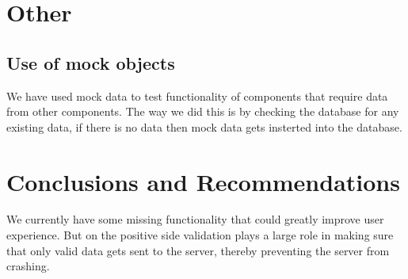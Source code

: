 \documentclass[11pt,fleqn]{book} %
\begin{document}

\chapter{Other}
	\section{Use of mock objects}
	We have used mock data to test functionality of components that require data from other components. The way we did this is by checking the database for any existing data, if there is no data then mock data gets insterted into the database.


\chapter{Conclusions and Recommendations}
We currently have some missing functionality that could greatly improve user experience. But on the positive side validation plays a large role in making sure that only valid data gets sent to the server, thereby preventing the server from crashing.
\end{document}
